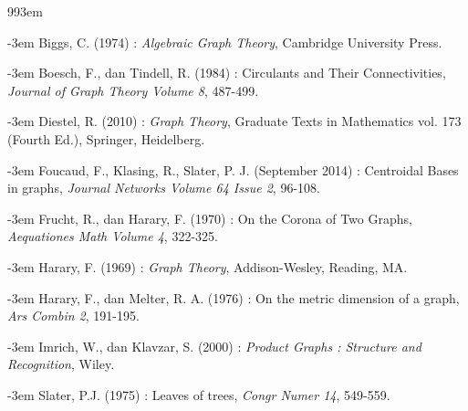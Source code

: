 \pagestyle{fancy}
\fancyhead[R]{}
\fancyfoot[C]{\thepage}
\def\bibindent{3em}
\renewcommand{\bibname}{DAFTAR PUSTAKA}
\begin{thebibliography}{99\kern\bibindent}
		\makeatletter
		\def\@biblabel#1{}
		\let\old@bibitem\bibitem
		\def\bibitem#1{\old@bibitem{#1}\leavevmode\kern-\bibindent}
		\makeatother
		
		 Biggs, C. (1974) : \textit{Algebraic Graph Theory}, Cambridge University Press.
		
		 Boesch, F., dan Tindell, R. (1984) : Circulants and Their Connectivities, \textit{Journal of Graph Theory Volume 8}, 487-499.
		
		 Diestel, R. (2010) : \textit{Graph Theory}, Graduate Texts in Mathematics vol. 173 (Fourth Ed.), Springer, Heidelberg.
		
		 Foucaud, F., Klasing, R., Slater, P. J. (September 2014) : Centroidal Bases in graphs, \textit{Journal Networks Volume 64 Issue 2}, 96-108. 
		
		 Frucht, R., dan Harary, F. (1970) : On the Corona of Two Graphs, \textit{Aequationes Math Volume 4}, 322-325.
		
		 Harary, F. (1969) : \textit{Graph Theory}, Addison-Wesley, Reading, MA.
		
		 Harary, F., dan Melter, R. A. (1976) : On the metric dimension of a graph, \textit{Ars Combin 2}, 191-195.
		
		 Imrich, W., dan Klavzar, S. (2000) : \textit{Product Graphs : Structure and Recognition}, Wiley.
		
		 Slater, P.J. (1975) : Leaves of trees, \textit{Congr Numer 14}, 549-559.
		
\end{thebibliography}